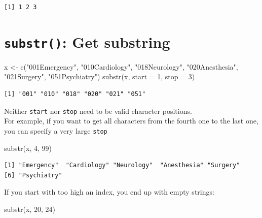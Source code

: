 \documentclass[
]{book}
\newenvironment{Shaded}{\begin{snugshade}}{\end{snugshade}}
\newcommand{\AttributeTok}[1]{\textcolor[rgb]{0.77,0.63,0.00}{#1}}
\newcommand{\DecValTok}[1]{\textcolor[rgb]{0.00,0.00,0.81}{#1}}
\newcommand{\FunctionTok}[1]{\textcolor[rgb]{0.00,0.00,0.00}{#1}}
\newcommand{\NormalTok}[1]{#1}
\newcommand{\OtherTok}[1]{\textcolor[rgb]{0.56,0.35,0.01}{#1}}
\newcommand{\StringTok}[1]{\textcolor[rgb]{0.31,0.60,0.02}{#1}}
\begin{document}
\begin{verbatim}
[1] 1 2 3
\end{verbatim}

\hypertarget{substr-get-substring}{%
\section{\texorpdfstring{\texttt{substr()}: Get substring}{substr(): Get substring}}\label{substr-get-substring}}

\begin{Shaded}
\begin{Highlighting}[]
\NormalTok{x }\OtherTok{\textless{}{-}} \FunctionTok{c}\NormalTok{(}\StringTok{"001Emergency"}\NormalTok{, }\StringTok{"010Cardiology"}\NormalTok{, }\StringTok{"018Neurology"}\NormalTok{, }
       \StringTok{"020Anesthesia"}\NormalTok{, }\StringTok{"021Surgery"}\NormalTok{, }\StringTok{"051Psychiatry"}\NormalTok{)}
\FunctionTok{substr}\NormalTok{(x, }\AttributeTok{start =} \DecValTok{1}\NormalTok{, }\AttributeTok{stop =} \DecValTok{3}\NormalTok{)}
\end{Highlighting}
\end{Shaded}

\begin{verbatim}
[1] "001" "010" "018" "020" "021" "051"
\end{verbatim}

Neither \texttt{start} nor \texttt{stop} need to be valid character positions.\\
For example, if you want to get all characters from the fourth one to the last one, you can specify a very large \texttt{stop}

\begin{Shaded}
\begin{Highlighting}[]
\FunctionTok{substr}\NormalTok{(x, }\DecValTok{4}\NormalTok{, }\DecValTok{99}\NormalTok{)}
\end{Highlighting}
\end{Shaded}

\begin{verbatim}
[1] "Emergency"  "Cardiology" "Neurology"  "Anesthesia" "Surgery"   
[6] "Psychiatry"
\end{verbatim}

If you start with too high an index, you end up with empty strings:

\begin{Shaded}
\begin{Highlighting}[]
\FunctionTok{substr}\NormalTok{(x, }\DecValTok{20}\NormalTok{, }\DecValTok{24}\NormalTok{)}
\end{Highlighting}
\end{Shaded}
\end{document}
